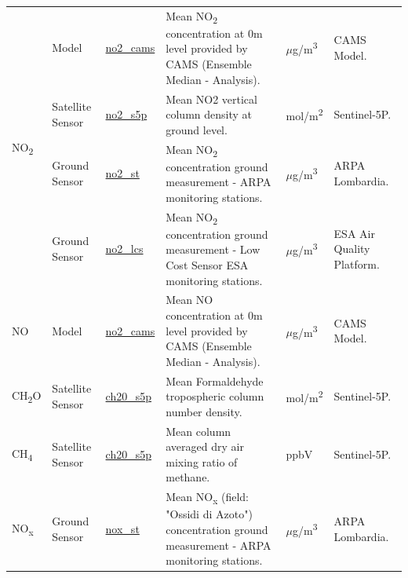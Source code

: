 \begin{center}
\begin{longtable}{ |p{1.5cm}|p{1.5cm}|p{2.3cm}|p{4cm}|p{2cm}|p{2.3cm}| }
\multirow{4}{4em}{NO\textsubscript{2}} & Model  & \underline{no2\_cams} & Mean NO\textsubscript{2} concentration at 0m level provided by CAMS  (Ensemble Median - Analysis).\par & $\mu$g/m\textsuperscript{3} & CAMS Model.\\ 
& Satellite \newline Sensor  & \underline{no2\_s5p} &  Mean NO2  vertical column density at ground level.\par & mol/m\textsuperscript{2} & Sentinel-5P.\\ 
& Ground \newline Sensor & \underline{no2\_st} &  Mean NO\textsubscript{2} concentration ground measurement - ARPA monitoring stations. \par & $\mu$g/m\textsuperscript{3} & ARPA \newline Lombardia.\\ 
& Ground \newline Sensor & \underline{no2\_lcs} &  Mean NO\textsubscript{2} concentration ground measurement - Low Cost Sensor ESA monitoring stations. \par & $\mu$g/m\textsuperscript{3} & ESA Air Quality Platform.\\ \hline

\multirow{1}{4em}{NO} & Model  & \underline{no2\_cams} & Mean NO concentration at 0m level provided by CAMS  (Ensemble Median - Analysis). \par& $\mu$g/m\textsuperscript{3} & CAMS Model.\\  \hline

\multirow{1}{4em}{CH\textsubscript{2}O} & Satellite \newline Sensor  & \underline{ch20\_s5p} & Mean Formaldehyde tropospheric column number density. \par& mol/m\textsuperscript{2} & Sentinel-5P.\\  \hline

\multirow{1}{4em}{CH\textsubscript{4}} & Satellite \newline Sensor  & \underline{ch20\_s5p} & Mean column averaged dry air mixing ratio of methane. \par& ppbV & Sentinel-5P.\\  \hline

\multirow{1}{4em}{NO\textsubscript{x}} & Ground \newline Sensor & \underline{nox\_st} &  Mean NO\textsubscript{x} (field: "Ossidi di Azoto") concentration ground measurement - ARPA monitoring stations.\par  & $\mu$g/m\textsuperscript{3} & ARPA \newline Lombardia.\\ \hline


\end{longtable}
\end{center}
